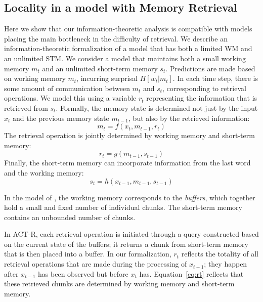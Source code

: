 \documentclass[11pt,letterpaper]{article}
\begin{document}


\subsection{Locality in a model with Memory Retrieval}

Here we show that our information-theoretic analysis is compatible with models placing the main bottleneck in the difficulty of retrieval.
We describe an information-theoretic formalization of a model that has both a limited WM and an unlimited STM.
We consider a model that maintains both a small working memory $m_t$ and an unlimited short-term memory $s_t$.
Predictions are made based on working memory $m_t$, incurring surprisal $H[w_t|m_t]$.
In each time step, there is some amount of communication between $m_t$ and $s_t$, corresponding to retrieval operations.
We model this using a variable $r_t$ representing the information that is retrieved from $s_t$.
Formally, the memory state is determined not just by the input $x_t$ and the previous memory state $m_{t-1}$, but also by the retrieved information:
\begin{equation}
	m_t = f(x_t, m_{t-1}, r_t) 
\end{equation}
The retrieval operation is jointly determined by working memory and short-term memory:
\begin{equation}\label{eq:rt}
	r_t = g(m_{t-1}, s_{t-1}) 
\end{equation}
Finally, the short-term memory can incorporate information from the last word and the working memory:
\begin{equation}
	s_t = h(x_{t-1}, m_{t-1}, s_{t-1}) 
\end{equation}

In the model of \cite{lewis-activation-based-2005}, the working memory corresponds to the \emph{buffers}, which together hold a small and fixed number of individual chunks.
The short-term memory contains an unbounded number of chunks.

In ACT-R, each retrieval operation is initiated through a query constructed based on the current state of the buffers; it returns a chunk from short-term memory that is then placed into a buffer.
In our formalization, $r_t$ reflects the totality of all retrieval operations that are made during the processing of $x_{t-1}$; they happen after $x_{t-1}$ has been observed but before $x_t$ has.
Equation~\ref{eq:rt} reflects that these retrieved chunks are determined by working memory and short-term memory.
\end{document}
